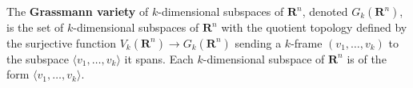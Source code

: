 The \textbf{Grassmann variety} of $k$-dimensional subspaces of $\mathbf{R}^n$, denoted $G_k(\mathbf{R}^n)$, is the set of $k$-dimensional subspaces of $\mathbf{R}^n$ with the quotient topology defined by the surjective function $V_k(\mathbf{R}^n) \rightarrow G_k(\mathbf{R}^n)$ sending a $k$-frame $(v_1, \ldots, v_k)$ to the subspace $\langle v_1, \ldots, v_k \rangle$ it spans. Each $k$-dimensional subspace of $\mathbf{R}^n$ is of the form $\langle v_1, \ldots, v_k \rangle$.
